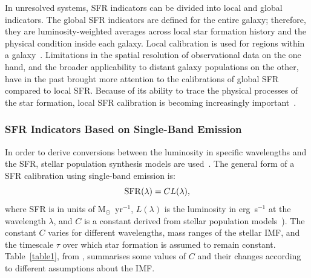 In unresolved systems, SFR indicators can be divided into local and global indicators. 
The global SFR indicators are defined for the entire galaxy; therefore, they are luminosity-weighted averages across local star formation history and the physical condition inside each galaxy. 
Local calibration is used for regions within a galaxy~\citep[e.g.,][]{Zhu08, Kennicutt09, Boquien10, Boquien11, Hao11}.
Limitations in the spatial resolution of observational data on the one hand, and the broader applicability to distant galaxy populations on the other, have in the past brought more attention to the calibrations of global SFR compared to local SFR. 
Because of its ability to trace the physical processes of the star formation, local SFR calibration is becoming increasingly important~\citep{Calzetti13}.

\subsubsection*{SFR Indicators Based on Single-Band Emission}

In order to derive conversions between the luminosity in specific wavelengths and the SFR, stellar population synthesis models are used~\citep{Kennicutt98b}. 
The general form of a SFR calibration using single-band emission is: 
\begin{equation}
\label{equ: sfrsingle}
{\rm SFR}(\lambda)= CL(\lambda),
\end{equation}
where SFR is in units of M${_\odot}$~yr$^{-1}$, $L(\lambda)$ is the luminosity in erg~s$^{-1}$ at the wavelength $\lambda$, and $C$ is a constant derived from stellar population models~\citep[e.g, starburst99][]{Leitherer99}). 
The constant $C$ varies for different wavelengths, mass ranges of the stellar IMF, and the timescale $\tau$ over which star formation is assumed to remain constant. 
Table~\ref{table1}, from \cite{Calzetti13}, summarises some values of $C$ and their changes according to different assumptions about the IMF. 

